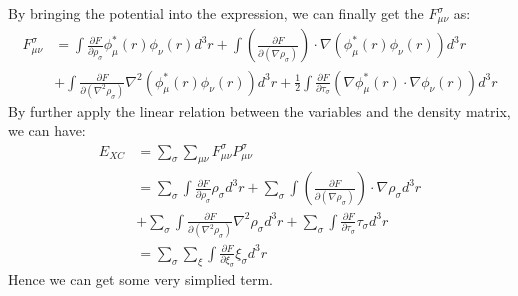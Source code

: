 By bringing the potential into the expression, we can finally get the
$F_{\mu\nu}^{\sigma}$ as:
\begin{equation}
\begin{split}
F_{\mu\nu}^{\sigma} &= 
\int \frac{\partial F} {\partial
\rho_{\sigma}} \phi^{*}_{\mu}(r)\phi_{\nu}(r) d^{3}r 
+ 
\int \left(
     \frac{\partial F}{\partial (\nabla\rho_{\sigma})}
     \right)\cdot 
\nabla(\phi^{*}_{\mu}(r)\phi_{\nu}(r)) d^{3}r \\ 
&+
\int
    \frac{\partial F}{\partial (\nabla^{2}\rho_{\sigma})}
\nabla^{2}(\phi^{*}_{\mu}(r)\phi_{\nu}(r)) d^{3}r + \frac{1}{2}
\int
    \frac{\partial F}{\partial \tau_{\sigma}}
(\nabla\phi^{*}_{\mu}(r)\cdotp\nabla\phi_{\nu}(r)) d^{3}r 
\end{split}
\label{functional_mega_gga_eq:6}
\end{equation}    
By further apply the linear relation between the variables and the
density matrix, we can have:
\begin{equation}
 \label{functional_mega_gga_eq:7}
\begin{split}
 E_{XC} 
&=\sum_{\sigma}\sum_{\mu\nu}F_{\mu\nu}^{\sigma}P_{\mu\nu}^{\sigma} \\
&= \sum_{\sigma}\int \frac{\partial F} {\partial
\rho_{\sigma}}\rho_{\sigma}d^{3}r 
+ 
\sum_{\sigma}\int \left(
     \frac{\partial F}{\partial (\nabla\rho_{\sigma})}
     \right)\cdot 
\nabla\rho_{\sigma} d^{3}r \\ 
&+
\sum_{\sigma}\int
    \frac{\partial F}{\partial (\nabla^{2}\rho_{\sigma})}
\nabla^{2}\rho_{\sigma} d^{3}r + \sum_{\sigma}
\int
    \frac{\partial F}{\partial \tau_{\sigma}}\tau_{\sigma}
 d^{3}r \\
&= \sum_{\sigma}\sum_{\xi}\int
    \frac{\partial F}{\partial \xi_{\sigma}}
\xi_{\sigma}d^{3}r
\end{split}
\end{equation} 
Hence we can get some very simplied term.

